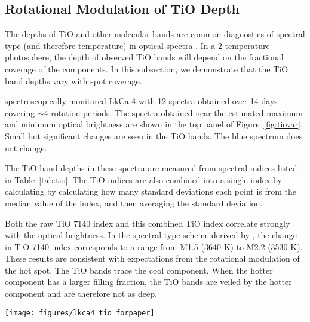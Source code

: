 \documentclass[twocolumn]{emulateapj}%
\begin{document}
\subsection{Rotational Modulation of TiO Depth}\label{sec:RotTiO}

The depths of TiO and other molecular bands are common diagnostics of spectral type (and therefore temperature) in optical spectra \citep[e.g.][]{kirkpatrick91}.  In a 2-temperature photosphere, the depth of observed TiO bands will depend on the fractional coverage of the components.  In this subsection, we demonstrate that the TiO band depths vary with spot coverage.

\citet{donati14} spectroscopically monitored LkCa 4 with 12 spectra obtained over 14 days covering $\sim 4$ rotation periods.  The spectra obtained near the estimated maximum and minimum optical brightness are shown in the top panel of Figure~\ref{fig:tiovar}.  Small but significant changes are seen in the TiO bands.  The blue spectrum does not change.

The TiO band depths in these spectra are measured from spectral indices listed in Table~\ref{tab:tio}.  The TiO indices are also combined into a single index by calculating by  calculating how many standard deviations each point is from the median value of the index, and then averaging the standard deviation.  

Both the raw TiO 7140 index and this combined TiO index correlate strongly with the optical brightness.  In the spectral type scheme derived by \citet{herczeg14}, the change in TiO-7140 index corresponds to a range from M1.5 (3640 K) to M2.2 (3530 K).  These results are consistent with expectations from the rotational modulation of the hot spot.  The TiO bands trace the cool component.  When the hotter component has a larger filling fraction, the TiO bands are veiled by the hotter component and are therefore not as deep.


\begin{figure*}
	\centering
	\texttt{[image: figures/lkca4\_tio\_forpaper]}
	\caption{Variability in TiO bands measured with ESPaDOnS (see also Table X).  The V-band emission is estimated from fits to the ASAS-SN lightcurve obtained during the same period.  The main panel shows a correlation between V-band magnitude and the TiO-7140 index, while the inset shows a similar correlation with the average of the TiO 6200, CaH 6800, and TiO 7600 indices.}
	\label{fig:tiovar}
\end{figure*}
\end{document}
